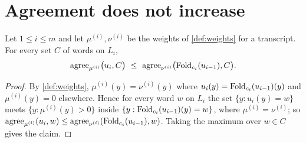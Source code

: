 \section{Agreement does not increase}

\begin{lemma}[No increase]\label{lem:no-increase}
Let $1\le i\le m$ and let $\mu^{(i)},\nu^{(i)}$ be the weights of \cref{def:weights} for a
transcript. For every set $C$ of words on $L_i$,
\[
\agree_{\mu^{(i)}}\big(u_i,C\big)\ \le\ \agree_{\nu^{(i)}}\big(\Fold_{c_i}(u_{i-1}),C\big).
\]
\end{lemma}

\begin{proof}
By \cref{def:weights}, $\mu^{(i)}(y)=\nu^{(i)}(y)$ where
$u_i(y)=\mathrm{Fold}_{c_i}(u_{i-1})(y)$ and $\mu^{(i)}(y)=0$ elsewhere. Hence for every word $w$ on
$L_i$ the set $\{y:u_i(y)=w\}$ meets $\{y:\mu^{(i)}(y)>0\}$ inside
$\{y:\mathrm{Fold}_{c_i}(u_{i-1})(y)=w\}$, where $\mu^{(i)}=\nu^{(i)}$; so
$\mathrm{agree}_{\mu^{(i)}}(u_i,w)\le\mathrm{agree}_{\nu^{(i)}}(\mathrm{Fold}_{c_i}(u_{i-1}),w)$. Taking the maximum
over $w\in C$ gives the claim.
\end{proof}
